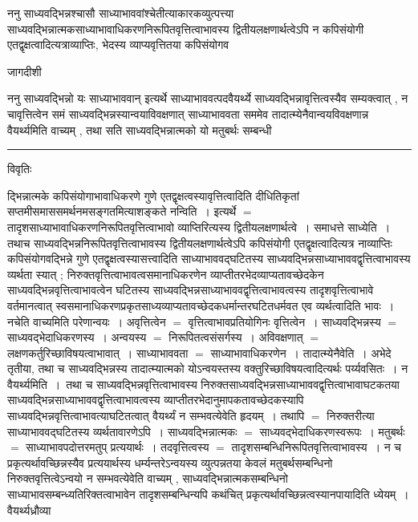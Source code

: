 \documentclass[10pt, openany]{book}
\begin{document}
{ननु साध्यवद्भिन्नश्चासौ साध्याभाववांश्चेतीत्याकारकव्युत्पत्त्या साध्यवद्भिन्नात्मकसाध्याभावाधिकरणनिरूपितवृत्तित्वाभावस्य द्वितीयलक्षणार्थत्वेऽपि न कपिसंयोगी एतद्वृक्षत्वादित्यत्राव्याप्तिः, भेदस्य व्याप्यवृत्तितया
कपिसंयोगव
\newpage
\begin{center} जागदीशी \end{center}
{\la ननु साध्यवद्भिन्नो यः साध्याभाववान् {\qt इत्यर्थे} साध्याभाववत्पदवैयर्थ्ये साध्यवद्भिन्नावृत्तित्वस्यैव सम्यक्त्वात् , न चावृत्तित्वेन समं साध्यवद्भिन्नस्यान्वयाविवक्षणात् साध्याभाववता सममेव तादात्म्येनैवान्वयविवक्षणान्न वैयर्थ्यमिति वाच्यम् , तथा सति साध्यवद्भिन्नात्मको यो मतुबर्थः सम्बन्धी}\\
\hrule
\begin{center}     विवृतिः \end{center}
द्भिन्नात्मके कपिसंयोगाभावाधिकरणे गुणे एतद्वृक्षत्वस्यावृत्तित्वादिति दीधितिकृतां सप्तमीसमाससमर्थनमसङ्गतमित्याशङ्कते {\la नन्विति~।} इत्यर्थे $=$ तादृशसाध्याभावाधिकरणनिरूपितवृत्तित्वाभावो व्याप्तिरित्यस्य द्वितीयलक्षणार्थत्वे~। समाधत्ते {\la साध्येति~।} तथाच साध्यवद्भिन्ननिरूपितवृत्तित्वाभावस्य
द्वितीयलक्षणार्थत्वेऽपि कपिसंयोगी एतद्वृक्षत्वादित्यत्र नाव्याप्तिः  कपिसंयोगवद्भिन्ने गुणे एतद्वृक्षत्वस्यासत्त्वादिति साध्याभाववद्घटितस्य साध्यवद्भिन्नसाध्याभाववद्वृत्तित्वाभावस्य व्यर्थता स्यात् ; निरुक्तवृत्तित्वाभावत्वसमानाधिकरणेन व्याप्तीतरभेदव्याप्यतावच्छेदकेन साध्यवद्भिन्नवृत्तित्वाभावत्वेन घटितस्य
साध्यवद्भिन्नसाध्याभाववद्वृत्तित्वाभावत्वस्य तादृशवृत्तित्वाभावे वर्तमानत्वात् स्वसमानाधिकरणप्रकृतसाध्यव्याप्यतावच्छेदकधर्मान्तरघटितधर्मवत एव व्यर्थत्वादिति भावः~। नचेति वाच्यमिति परेणान्वयः~। अवृत्तित्वेन $=$ वृत्तित्वाभावप्रतियोगिनः वृत्तित्वेन~। साध्यवद्भिन्नस्य $=$ साध्यवद्भेदाधिकरणस्य~। अन्वयस्य $=$ निरूपितत्वसंसर्गस्य~।
अविवक्षणात् $=$ लक्षणकर्तुरिच्छाविषयत्वाभावात्~। साध्याभाववता $=$ साध्याभावाधिकरणेन~। तादात्म्येनैवेति~। अभेदे तृतीया, तथा च साध्यवद्भिन्नस्य तादात्म्यात्मको योऽन्वयस्तस्य वक्तुरिच्छाविषयत्वादित्यर्थः पर्य्यवसितः~। न {\la वैयर्थ्यमिति~।}~तथा च साध्यवद्भिन्नवृत्तित्वाभावस्य निरुक्तसाध्यवद्भिन्नसाध्याभाववद्वृत्तित्वाभावाघटकतया साध्यवद्भिन्नसाध्याभाववद्वृत्तित्वाभावत्वस्य व्याप्तीतरभेदानुमापकतावच्छेदकस्यापि साध्यवद्भिन्नवृत्तित्वाभावत्याघटितत्वात् वैयर्थ्यं न सम्भवत्येवेति हृदयम्~। तथापि $=$ निरुक्तरीत्या साध्याभाववद्घटितस्य व्यर्थतावारणेऽपि~। साध्यवद्भिन्नात्मकः $=$ साध्यवद्भेदाधिकरणस्वरूपः~। मतुबर्थः $=$ साध्याभावपदोत्तरमतुप् प्रत्ययार्थः~। तदवृत्तित्वस्य $=$ तादृशसम्बन्धिनिरूपितवृत्तित्वाभावस्य~। न च प्रकृत्यर्थावच्छिन्नस्यैव प्रत्ययार्थस्य धर्म्यन्तरेऽन्वयस्य व्युत्पन्नतया केवलं मतुबर्थसम्बन्धिनो निरुक्तवृत्तित्वेऽन्वयो न सम्भवत्येवेति वाच्यम् , साध्यवद्भिन्नात्मकसम्बन्धिनो साध्याभावसम्बन्ध्यतिरिक्तत्वाभावेन तादृशसम्बन्धिन्यपि कथंचित् प्रकृत्यर्थावच्छिन्नत्वस्यानपायादिति ध्येयम्~।वैयर्थ्यध्रौव्या
}
\end{document}
